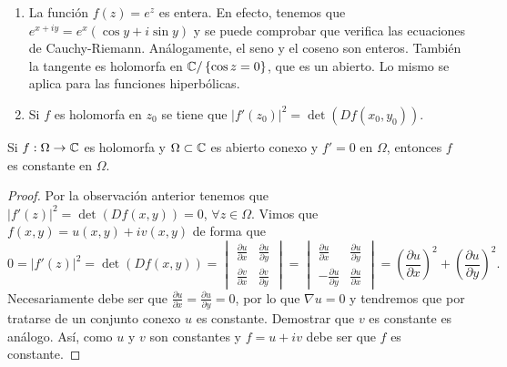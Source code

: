 \begin{observation}
\begin{enumerate}
	\item La función $\displaystyle f\left(z\right)=e^{z} $ es entera. En efecto, tenemos que $\displaystyle e^{x + iy}=e^{x}\left(\cos y + i\sin y\right) $ y se puede comprobar que verifica las ecuaciones de Cauchy-Riemann. Análogamente, el seno y el coseno son enteros. También la tangente es holomorfa en $\displaystyle \mathbb{C}/ \left\{ \cos z = 0\right\}  $, que es un abierto. Lo mismo se aplica para las funciones hiperbólicas. 
	\item Si $\displaystyle f $ es holomorfa en $\displaystyle z_{0} $ se tiene que $\displaystyle \left|f'\left(z_{0}\right)\right|^{2}=\det\left(Df\left(x_{0}, y_{0}\right)\right) $. 
\end{enumerate}
\end{observation}
\begin{colorary}
Si $\displaystyle f : \Omega \to \mathbb{C}$ es holomorfa y $\displaystyle \Omega \subset \mathbb{C} $ es abierto conexo y $\displaystyle f'=0 $ en $\displaystyle \Omega  $, entonces $\displaystyle f $ es constante en $\displaystyle \Omega  $. 
\end{colorary}
\begin{proof}
	Por la observación anterior tenemos que $\displaystyle \left|f'\left(z\right)\right|^{2}=\det\left(Df\left(x,y\right)\right)=0 $, $\displaystyle \forall z \in \Omega  $. Vimos que $\displaystyle f\left(x,y\right)=u\left(x,y\right) + iv\left(x,y\right) $ de forma que
	\[0 = \left|f'\left(z\right)\right|^{2}=\det\left(Df\left(x,y\right)\right)=\begin{vmatrix} \frac{\partial u}{\partial x} & \frac{\partial u}{\partial y} \\ \frac{\partial v}{\partial x} & \frac{\partial v}{\partial y} \end{vmatrix} =\begin{vmatrix} \frac{\partial u}{\partial x} & \frac{\partial u}{\partial y} \\ -\frac{\partial u}{\partial y} & \frac{\partial u}{\partial x} \end{vmatrix} = \left(\frac{\partial u}{\partial x}\right)^{2} + \left(\frac{\partial u}{\partial y}\right)^{2} .\]
Necesariamente debe ser que $\displaystyle \frac{\partial u}{\partial x}=\frac{\partial u}{\partial y}=0 $, por lo que $\displaystyle \nabla u = 0 $ y tendremos que por tratarse de un conjunto conexo $\displaystyle u  $ es constante. Demostrar que $\displaystyle v $ es constante es análogo. Así, como $\displaystyle u $ y $\displaystyle v $ son constantes y $\displaystyle f = u + iv $ debe ser que $\displaystyle f $ es constante. 	
\end{proof}

